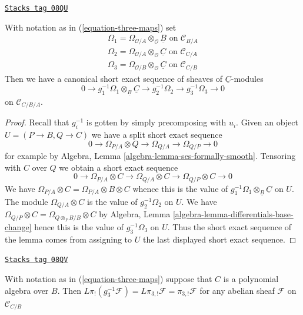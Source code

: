 \begin{lemma}
\label{cotangent-lemma-triangle-ses}
\href{https://stacks.math.columbia.edu/tag/08QU}{\texttt{Stacks tag 08QU}}

With notation as in (\ref{equation-three-maps}) set
$$
\begin{matrix}
\Omega_1 = \Omega_{\mathcal{O}/A} \otimes_\mathcal{O} \underline{B}
\text{ on }\mathcal{C}_{B/A} \\
\Omega_2 = \Omega_{\mathcal{O}/A} \otimes_\mathcal{O} \underline{C}
\text{ on }\mathcal{C}_{C/A} \\
\Omega_3 = \Omega_{\mathcal{O}/B} \otimes_\mathcal{O} \underline{C}
\text{ on }\mathcal{C}_{C/B}
\end{matrix}
$$
Then we have a canonical short exact sequence of sheaves
of $\underline{C}$-modules
$$
0 \to g_1^{-1}\Omega_1 \otimes_{\underline{B}} \underline{C} \to
g_2^{-1}\Omega_2 \to
g_3^{-1}\Omega_3 \to 0
$$
on $\mathcal{C}_{C/B/A}$.
\end{lemma}

\begin{proof}
Recall that $g_i^{-1}$ is gotten by simply precomposing with $u_i$.
Given an object $U = (P \to B, Q \to C)$ we have a split
short exact sequence
$$
0 \to \Omega_{P/A} \otimes Q \to \Omega_{Q/A} \to \Omega_{Q/P} \to 0
$$
for example by Algebra, Lemma \ref{algebra-lemma-ses-formally-smooth}.
Tensoring with $C$ over $Q$ we obtain a short exact sequence
$$
0 \to \Omega_{P/A} \otimes C \to \Omega_{Q/A} \otimes C \to
\Omega_{Q/P} \otimes C \to 0
$$
We have $\Omega_{P/A} \otimes C = \Omega_{P/A} \otimes B \otimes C$
whence this is the value of
$g_1^{-1}\Omega_1 \otimes_{\underline{B}} \underline{C}$
on $U$. The module $\Omega_{Q/A} \otimes C$ is the value of
$g_2^{-1}\Omega_2$ on $U$.
We have $\Omega_{Q/P} \otimes C = \Omega_{Q \otimes_P B/B} \otimes C$
by Algebra, Lemma \ref{algebra-lemma-differentials-base-change}
hence this is the value of
$g_3^{-1}\Omega_3$ on $U$. Thus the short exact sequence of the
lemma comes from assigning to $U$ the last displayed short exact
sequence.
\end{proof}

\begin{lemma}
\label{cotangent-lemma-polynomial-on-top}
\href{https://stacks.math.columbia.edu/tag/08QV}{\texttt{Stacks tag 08QV}}

With notation as in (\ref{equation-three-maps})
suppose that $C$ is a polynomial algebra over $B$. Then
$L\pi_!(g_3^{-1}\mathcal{F}) = L\pi_{3, !}\mathcal{F} = \pi_{3, !}\mathcal{F}$
for any abelian sheaf $\mathcal{F}$ on $\mathcal{C}_{C/B}$
\end{lemma}

